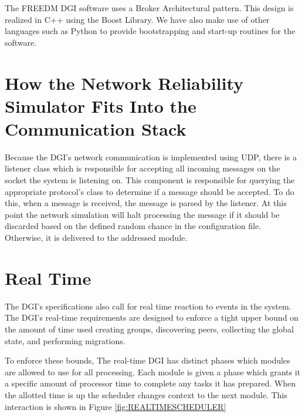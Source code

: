 The FREEDM DGI software uses a Broker Architectural pattern. This design is 
realized in C++ using the Boost Library\cite{BOOST}. We have also make use of 
other languages such as Python to provide bootstrapping and start-up routines 
for the software.

\section{How the Network Reliability Simulator Fits Into the Communication 
Stack}

Because the DGI's network communication is implemented using UDP, there is a 
listener class which is responsible for accepting all incoming messages on the 
socket the system is listening on. This component is responsible for querying 
the appropriate protocol's class to determine
if a message should be accepted. To do this, when a message is received, the 
message is parsed by the listener. At this point the network simulation will 
halt processing the  message if it should be discarded based on the defined 
random chance in the configuration file. Otherwise, it is delivered to the 
addressed module.

\section{Real Time}
The DGI's specifications also call for real time reaction to events in the
system. The DGI's real-time requirements are designed to enforce a tight
upper bound on the amount of time used creating groups, discovering peers,
collecting the global state, and performing migrations.

To enforce these bounds, The real-time DGI has distinct phases which modules
are allowed to use for all processing. Each module is given a phase which
grants it a specific amount of processor time to complete any tasks it has
prepared. When the allotted time is up the scheduler changes context to the
next module. This interaction is shown in Figure \ref{fig:REALTIMESCHEDULER}

